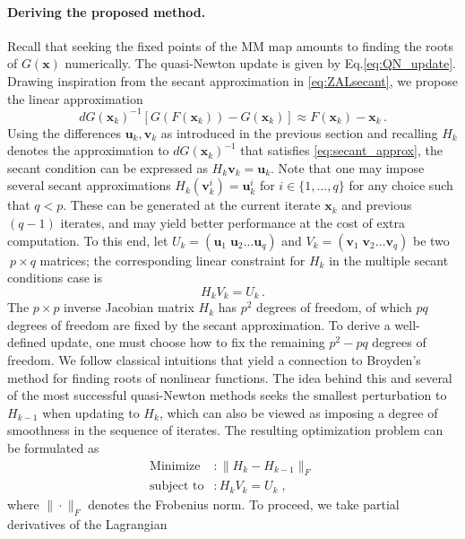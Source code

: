 \documentclass{statsoc}
\newcommand{\bu}{\boldsymbol{u}}
\newcommand{\bv}{\boldsymbol{v}}
\newcommand{\bx}{\boldsymbol{x}}
\begin{document}
\paragraph{Deriving the proposed method.}
Recall that seeking the fixed points of the MM map amounts to finding the roots of  $G(\bx)$ numerically. The quasi-Newton update is given by Eq.\eqref{eq:QN_update}. Drawing inspiration from the secant approximation in \eqref{eq:ZALsecant}, we propose the linear approximation
\begin{equation} \label{eq:secant_approx}
    dG(\bx_k)^{-1} \left[G(F(\bx_k)) - G(\bx_k)\right] \approx F(\bx_k) - \bx_k\,.
\end{equation}
Using the differences $\bu_k, \bv_k$ as introduced in the previous section and recalling $H_k$ denotes the approximation to $dG(\bx_k)^{-1}$ that satisfies \eqref{eq:secant_approx}, the secant condition can be expressed as $H_{k}\bv_k = \bu_k$. Note that one may impose several secant approximations $H_k (\bv_k^i) = \bu_k^i$ for $i \in \{1, ..., q\}$ for any choice such that $q < p$. These can be generated at the current iterate $\bx_k$ and previous $(q-1)$ iterates, and may yield better performance at the cost of extra computation. To this end, let $U_k = (\bu_1\;\bu_2 \dots \bu_q)$ and $V_k = (\bv_1 \; \bv_2 \dots \bv_q)$ be two $\ p\times q$ matrices; the corresponding linear constraint for $H_k$ in the multiple secant conditions case is
\begin{equation} \label{eq:bqn_secant_condition}
    H_k V_k = U_k\,.
\end{equation}
The $p \times p$ inverse Jacobian matrix $H_k$ has $p^2$ degrees of freedom, of which $pq$ degrees of freedom are fixed by the secant approximation. To derive a well-defined update, one must choose how to fix the remaining $p^2 - pq$ degrees of freedom. We follow classical intuitions that yield a connection to Broyden's method for finding roots of nonlinear functions.  
The idea behind this and several of the most successful quasi-Newton methods seeks the smallest perturbation to $H_{k-1}$ when updating to $H_k$, which can also be viewed as imposing a degree of smoothness in the sequence of iterates. The resulting optimization problem can be formulated as
\begin{align} \label{eq:minimization}
    \text{Minimize} &: \|H_{k} - H_{k-1}\|_F\,  \nonumber\\
    \text{subject to} &: H_{k}V_k = U_k\;,
\end{align} 
where $\|\cdot\|_F$ denotes the Frobenius norm. To proceed, we take  partial derivatives of the Lagrangian
\end{document}
